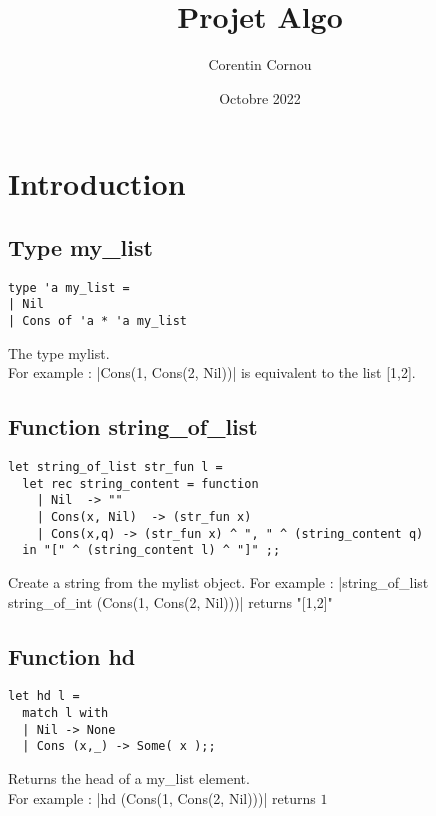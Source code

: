 \documentclass{article}
\title{Projet Algo}
\author{Corentin Cornou }
\date{Octobre 2022}
\begin{document}
\maketitle


\section{Introduction}
\subsection{Type my\_list}
\begin{verbatim}
type 'a my_list =
| Nil
| Cons of 'a * 'a my_list
\end{verbatim}

The type my\textunderscore list.\\

For example : |Cons(1, Cons(2, Nil))| is equivalent to the list [1,2].

\bigskip

\subsection{Function string\_of\_list}
\begin{verbatim}
let string_of_list str_fun l =
  let rec string_content = function
    | Nil  -> ""
    | Cons(x, Nil)  -> (str_fun x)
    | Cons(x,q) -> (str_fun x) ^ ", " ^ (string_content q)
  in "[" ^ (string_content l) ^ "]" ;;
\end{verbatim}

Create a string from the my\textunderscore list object.
For example : 
|string_of_list string_of_int (Cons(1, Cons(2, Nil)))|
returns "[1,2]"\\

\newpage
\subsection{Function hd}

\begin{verbatim}
let hd l =
  match l with
  | Nil -> None
  | Cons (x,_) -> Some( x );;
\end{verbatim}

Returns the head of a my\_list element.\\

For example : |hd (Cons(1, Cons(2, Nil)))| returns $1$\\
\end{document}
